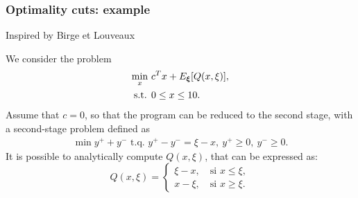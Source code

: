 \documentclass{beamer}
\begin{document}
	

	



	
	


	
	

\begin{frame}
\frametitle{Optimality cuts: example}
	
{\red Inspired by Birge et Louveaux}
	
We consider the problem
\begin{align*}
\min_x\ & c^Tx + E_{{\boldsymbol{\xi}}} [ Q(x,\xi) ],\\
\mbox{s.t. } & 0 \leq x \leq 10.
\end{align*}
Assume that $c = 0$, so that the program can be reduced to the second stage, with a second-stage problem defined as
\begin{align*}
\min y^++y^- \mbox{ t.q. } y^+-y^- = \xi - x,\ y^+ \geq 0,\ y^- \geq 0.
\end{align*}
It is possible to analytically compute $Q(x,\xi)$, that can be expressed as:
\[
Q(x,\xi) =
\begin{cases}
\xi - x,\quad \mbox{si } x \leq \xi,\\
x - \xi,\quad \mbox{si } x \geq \xi.
\end{cases}
\]
	
\end{frame}
\end{document}
